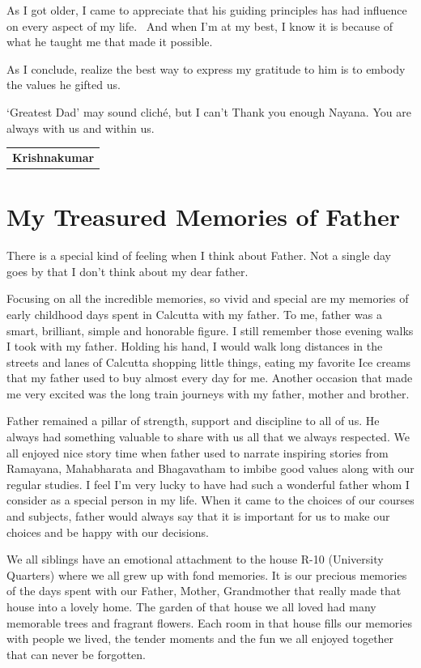 As I got older, I came to appreciate that his guiding principles has had influence on every aspect of my life.  And when I’m at my best, I know it is because of what he taught me that made it possible. 

As I conclude, realize the best way to express my gratitude to him is to embody the values he gifted us. 

`Greatest Dad' may sound clich\'e, but I can’t Thank you enough Nayana. You are always with us and within us.
\bigskip

\begin{flushright}
\begin{tabular}{c}
\textbf{Krishnakumar}
\end{tabular}
\end{flushright}
\bigskip

\section*{My Treasured Memories of Father}

There is a special kind of feeling when I think about Father.  Not a single day goes by that I don’t think about my dear father.

Focusing on all the incredible memories, so vivid and special are my memories of early childhood days spent in Calcutta with my father. To me, father was a smart, brilliant, simple and honorable figure. I still remember those evening walks I took with my father. Holding his hand, I would walk long distances in the streets and lanes of Calcutta shopping little things, eating my favorite Ice creams that my father used to buy almost every day for me. Another occasion that made me very excited was the long train journeys with my father, mother and brother.

Father remained a pillar of strength, support and discipline to all of us. He always had something valuable to share with us all that we always respected. We all enjoyed nice story time when father used to narrate inspiring stories from Ramayana, Mahabharata and Bhagavatham to imbibe good values along with our regular studies. I feel I’m very lucky to have had such a wonderful father whom I consider as a special person in my life. When it came to the choices of our courses and subjects, father would always say that it is important for us to make our choices and be happy with our decisions.

We all siblings have an emotional attachment to the house R-10 (University Quarters) where we all grew up with fond memories. It is our precious memories of the days spent with our Father, Mother, Grandmother that really made that house into a lovely home. The garden of that house we all loved had many memorable trees and fragrant flowers. Each room in that house fills our memories with people we lived, the tender moments and the fun we all enjoyed together that can never be forgotten.


